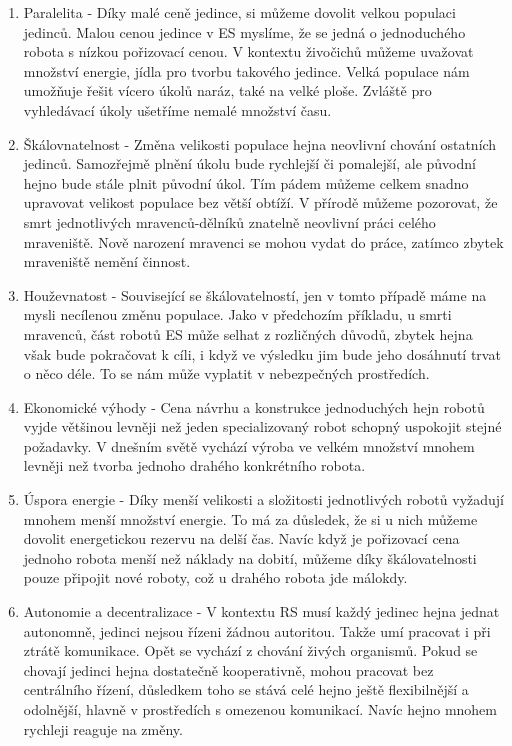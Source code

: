     \begin{enumerate}
        \item Paralelita - Díky malé ceně jedince, si můžeme dovolit velkou populaci jedinců. Malou cenou jedince v ES myslíme, že se jedná o jednoduchého robota s nízkou pořizovací cenou. V kontextu živočichů můžeme uvažovat množství energie, jídla pro tvorbu takového jedince. Velká populace nám umožňuje řešit vícero úkolů naráz, také na velké ploše. Zvláště pro vyhledávací úkoly ušetříme nemalé množství času. 
        \item Škálovnatelnost - Změna velikosti populace hejna neovlivní chování ostatních jedinců. Samozřejmě plnění úkolu bude rychlejší či pomalejší, ale původní hejno bude stále plnit původní úkol. Tím pádem můžeme celkem snadno upravovat velikost populace bez větší obtíží. V přírodě můžeme pozorovat, že smrt  jednotlivých mravenců-dělníků znatelně neovlivní práci celého mraveniště. Nově narození mravenci se mohou vydat do práce, zatímco zbytek mraveniště nemění činnost. 
        \item Houževnatost - Související se škálovatelností, jen v tomto případě máme na mysli necílenou změnu populace. Jako v předchozím příkladu, u smrti mravenců, část robotů ES může selhat z rozličných důvodů, zbytek hejna však bude pokračovat k cíli, i když ve výsledku jim bude jeho dosáhnutí trvat o něco déle. To se nám může vyplatit v nebezpečných prostředích. 
        \item Ekonomické výhody - Cena návrhu a konstrukce jednoduchých hejn robotů vyjde většinou levněji než jeden specializovaný robot schopný uspokojit stejné požadavky. V dnešním světě vychází výroba ve velkém množství mnohem levněji než tvorba jednoho drahého konkrétního robota.
        \item Úspora energie - Díky menší velikosti a složitosti jednotlivých robotů vyžadují mnohem menší množství energie. To má za důsledek, že si u nich můžeme dovolit energetickou rezervu na delší čas. Navíc když je pořizovací cena jednoho robota menší než náklady na dobití, můžeme díky škálovatelnosti pouze připojit nové roboty, což u drahého robota jde málokdy. 
        \item Autonomie a decentralizace - V kontextu RS musí každý jedinec hejna jednat autonomně, jedinci nejsou řízeni žádnou autoritou. Takže umí pracovat i při ztrátě komunikace. Opět se vychází z chování živých organismů. Pokud se chovají jedinci hejna dostatečně kooperativně, mohou pracovat bez centrálního řízení, důsledkem toho se stává celé hejno ještě flexibilnější a odolnější, hlavně v prostředích s omezenou komunikací. Navíc hejno mnohem rychleji reaguje na změny. 
    \end{enumerate}
